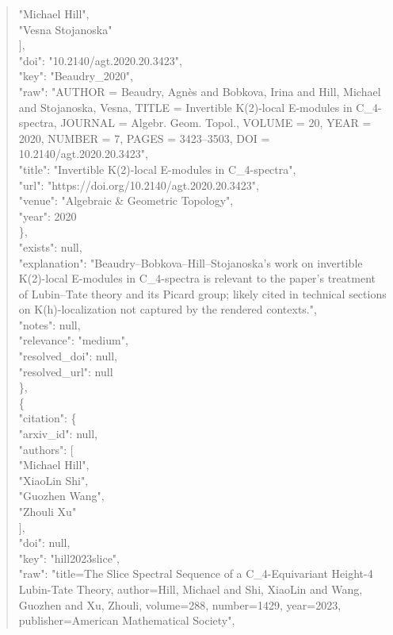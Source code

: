 \documentclass[11pt]{article}
\begin{document}
\begin{quote}
          "Michael Hill",\\
          "Vesna Stojanoska"\\
        ],\\
        "doi": "10.2140/agt.2020.20.3423",\\
        "key": "Beaudry\_2020",\\
        "raw": "AUTHOR = Beaudry, Agnès and Bobkova, Irina and Hill, Michael and Stojanoska, Vesna, TITLE = Invertible K(2)-local E-modules in C\_4-spectra, JOURNAL = Algebr. Geom. Topol., VOLUME = 20, YEAR = 2020, NUMBER = 7, PAGES = 3423--3503, DOI = 10.2140/agt.2020.20.3423",\\
        "title": "Invertible K(2)-local E-modules in C\_4-spectra",\\
        "url": "https://doi.org/10.2140/agt.2020.20.3423",\\
        "venue": "Algebraic \& Geometric Topology",\\
        "year": 2020\\
      \},\\
      "exists": null,\\
      "explanation": "Beaudry--Bobkova--Hill--Stojanoska's work on invertible K(2)-local E-modules in C\_4-spectra is relevant to the paper's treatment of Lubin--Tate theory and its Picard group; likely cited in technical sections on K(h)-localization not captured by the rendered contexts.",\\
      "notes": null,\\
      "relevance": "medium",\\
      "resolved\_doi": null,\\
      "resolved\_url": null\\
    \},\\
    \{\\
      "citation": \{\\
        "arxiv\_id": null,\\
        "authors": [\\
          "Michael Hill",\\
          "XiaoLin Shi",\\
          "Guozhen Wang",\\
          "Zhouli Xu"\\
        ],\\
        "doi": null,\\
        "key": "hill2023slice",\\
        "raw": "title=The Slice Spectral Sequence of a C\_4-Equivariant Height-4 Lubin-Tate Theory, author=Hill, Michael and Shi, XiaoLin and Wang, Guozhen and Xu, Zhouli, volume=288, number=1429, year=2023, publisher=American Mathematical Society",\\

\end{quote}
\end{document}
